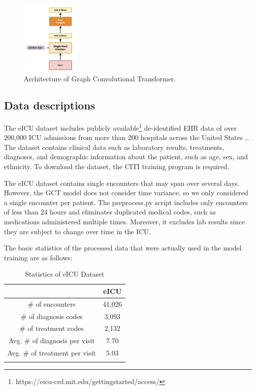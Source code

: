 \documentclass[11pt,a4paper]{article}
\begin{document}
\begin{figure}
    \centering
    \includegraphics[width=0.25\textwidth]{GCT Architecture.png}
    \caption{Architecture of Graph Convolutional Transformer.}
    \label{fig:gct-a}
\end{figure}


\subsection{Data descriptions}
The eICU dataset includes publicly available\footnote{https://eicu-crd.mit.edu/gettingstarted/access/} de-identified EHR data of over 200,000 ICU admissions from more than 200 hospitals across the United States \citep{DBLP:conf/bcb/JohnsonPCM17},. The dataset contains clinical data such as laboratory results, treatments, diagnoses, and demographic information about the patient, such as age, sex, and ethnicity. To download the dataset, the CITI training program is required.

The eICU dataset contains single encounters that may span over several days. However, the GCT model does not consider time variance, so we only considered a single encounter per patient. The preprocess.py script includes only encounters of less than 24 hours and eliminates duplicated medical codes, such as medications administered multiple times. Moreover, it excludes lab results since they are subject to change over time in the ICU.

The basic statistics of the processed data that were actually used in the model training are as follows:
\begin{table}[h]
    \centering
    \begin{tabular}{c c}
        \Xhline{2\arrayrulewidth}
         & eICU \\
        \hline
        \# of encounters & 41,026 \\
        \# of diagnosis codes & 3,093 \\
        \# of treatment codes & 2,132 \\
        \hline
        Avg. \# of diagnosis per visit & 7.70 \\
        Avg. \# of treatment per visit & 5.03 \\
        \Xhline{2\arrayrulewidth}
    \end{tabular}
    \caption{Statistics of eICU Dataset}
\end{table}
\end{document}
